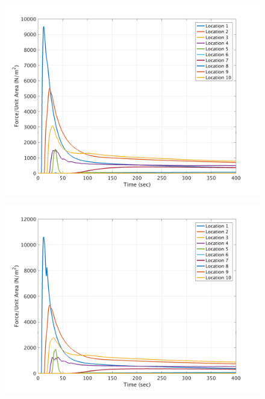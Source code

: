 \documentclass[a4paper,10pt]{article}
\begin{document}
\begin{figure}[H]
	\begin{minipage}[b]{0.5\linewidth}
	\centering
    \includegraphics[width=1\textwidth]{MeansAll/FgravP_all.png}
        \label{fig:M_FgPall}
	\end{minipage}	
	\begin{minipage}[b]{0.5\linewidth}
	\centering
    \includegraphics[width=1\textwidth]{MeansAll/FbedP_all.png}
        \label{fig:M_FbPall}
	\end{minipage}


\end{figure}
\end{document}

